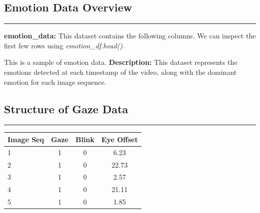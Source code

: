 \documentclass{article}
\begin{document}
\subsection{Emotion Data Overview}
\begin{center}
    \color{green}\rule{1\linewidth}{0.7mm}
\end{center}
\textbf{emotion\_data:} This dataset contains the following columns. We can inspect the first few rows using \textit{emotion\_df.head()}.
\vspace{0.2in}
\begin{tcolorbox}[colback=backgroundColor, colframe==accentColor2, title=Emotion Data Sample, fonttitle=\bfseries]
This is a sample of emotion data.
\noindent \textbf{Description:} This dataset represents the emotions detected at each timestamp of the video, along with the dominant emotion for each image sequence.
\\
\end{tcolorbox}

\subsection{Structure of Gaze Data}
\begin{center}
    \color{green}\rule{1\linewidth}{0.7mm}
\end{center}
\begin{tcolorbox}[colback=backgroundColor, colframe=accentColor2, title=Gaze Data Structure, fonttitle=\bfseries]
\begin{tabular}{p{2.5cm} ccc}
\toprule
\textbf{Image Seq} & \textbf{Gaze} & \textbf{Blink} & \textbf{Eye Offset} \\
\midrule
1 & 1 & 0 & 6.23 \\
2 & 1 & 0 & 22.73 \\
3 & 1 & 0 & 2.57 \\
4 & 1 & 0 & 21.11 \\
5 & 1 & 0 & 1.85 \\
\bottomrule
\end{tabular}
\end{tcolorbox}
\end{document}
